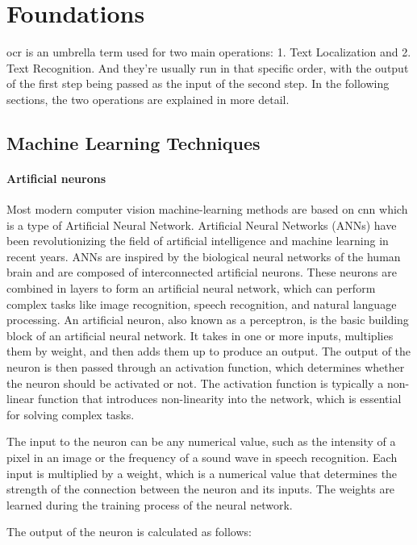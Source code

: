 \chapter{Foundations}
\label{ch:foundations}

\gls{ocr} is an umbrella term used for two main operations: 1. Text Localization and 2. Text Recognition.
And they're usually run in that specific order, with the output of the first step being passed as the input of the second step. In the following sections, the two operations are explained in more detail.

\section{Machine Learning Techniques}

\subsubsection*{Artificial neurons}
Most modern computer vision machine-learning methods are based on \gls{cnn} which is a type of Artificial Neural Network. Artificial Neural Networks (ANNs) have been revolutionizing the field of artificial intelligence and machine learning in recent years. ANNs are inspired by the biological neural networks of the human brain and are composed of interconnected artificial neurons. These neurons are combined in layers to form an artificial neural network, which can perform complex tasks like image recognition, speech recognition, and natural language processing.
An artificial neuron, also known as a perceptron, is the basic building block of an artificial neural network. It takes in one or more inputs, multiplies them by weight, and then adds them up to produce an output. The output of the neuron is then passed through an activation function, which determines whether the neuron should be activated or not. The activation function is typically a non-linear function that introduces non-linearity into the network, which is essential for solving complex tasks.

The input to the neuron can be any numerical value, such as the intensity of a pixel in an image or the frequency of a sound wave in speech recognition. Each input is multiplied by a weight, which is a numerical value that determines the strength of the connection between the neuron and its inputs. The weights are learned during the training process of the neural network.

The output of the neuron is calculated as follows:

